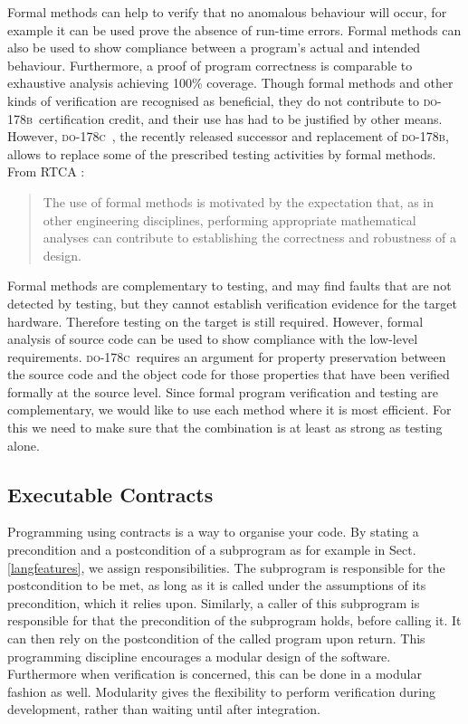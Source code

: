 \documentclass[sttt,draft]{svjour}
\newcommand{\DOB}{\textsc{do-178b}}
\newcommand{\DOC}{\textsc{do-178c}}
\begin{document}
Formal methods can help to verify that no anomalous behaviour will
occur, for example it can be used prove the absence of run-time
errors. Formal methods can also be used to show compliance between a
program's actual and intended behaviour. Furthermore, a proof of
program correctness is comparable to exhaustive analysis achieving
100\% coverage. Though formal methods and other kinds of verification
are recognised as beneficial, they do not contribute to \DOB\
certification credit, and their use has had to be justified by other
means. However, \DOC\ \cite{do178c}, the recently released successor and
replacement of \DOB, allows to replace some of the prescribed testing
activities by formal methods. From RTCA \cite{do178c}:
%
\begin{quote}
  The use of formal methods is motivated by the expectation that, as
  in other engineering disciplines, performing appropriate
  mathematical analyses can contribute to establishing the correctness
  and robustness of a design.
\end{quote}
%
Formal methods are complementary to testing, and may find faults that
are not detected by testing, but they cannot establish verification
evidence for the target hardware. Therefore testing on the target is
still required. However, formal analysis of source code can be used to
show compliance with the low-level requirements. \DOC\ requires an
argument for property preservation between the source code and the
object code for those properties that have been verified formally at
the source level. Since formal program verification and testing are
complementary, we would like to use each method where it is most
efficient. For this we need to make sure that the combination is at
least as strong as testing alone.

\subsection{Executable Contracts}
Programming using contracts is a way to organise your code. By stating
a precondition and a postcondition of a subprogram as for example in
Sect. \ref{langfeatures}, we assign responsibilities. The subprogram
is responsible for the postcondition to be met, as long as it is
called under the assumptions of its precondition, which it relies
upon. Similarly, a caller of this subprogram is responsible for that
the precondition of the subprogram holds, before calling it. It can
then rely on the postcondition of the called program upon return. This
programming discipline encourages a modular design of the
software. Furthermore when verification is concerned, this can be done
in a modular fashion as well. Modularity gives the flexibility to
perform verification during development, rather than waiting until
after integration.
\end{document}

